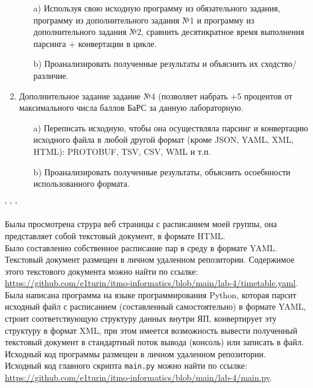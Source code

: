 \begin{enumerate}
    \begin{itemize}
        \item[a)] Используя свою исходную программу из обязательного  задания, программу из дополнительного задания №1 и  программу из дополнительного задания №2, сравнить  десятикратное время выполнения парсинга + конвертации в  цикле.
        \item[b)] Проанализировать полученные результаты и объяснить их  сходство/различие.
    \end{itemize}
\item Дополнительное задание задание №4 (позволяет набрать +5 процентов  от максимального числа баллов БаРС за данную лабораторную.
    \begin{itemize}
        \item[a)] Переписать исходную, чтобы она осуществляла парсинг и  конвертацию исходного файла в любой другой формат (кроме  JSON, YAML, XML, HTML): PROTOBUF, TSV, CSV, WML и  т.п.
        \item[b)] Проанализировать полученные результаты, объяснить  осоебнности использованного формата.
    \end{itemize}
\end{enumerate}
\begin{center}
    {` ` `}
\end{center}  


\newpage
{}
Былы просмотрена струра веб страницы с расписанием моей группы, она представляет собой текстовый документ, в формате HTML.\\
Было составленно собственное расписание пар в среду в формате YAML.
Текстовый документ размещен в личном удаленном репозитории.  Содержимое этого текстового документа можно найти по ссылке: \url{https://github.com/e1turin/itmo-informatics/blob/main/lab-4/timetable.yaml}.\\


Была написана программа на языке программирования Python, которая парсит исходный файл с расписанием (составленный самостоятельно) в формате YAML, строит соответствующую структуру данных внутри ЯП, конвертирует эту структуру в формат XML, при этом имеется возможность вывести полученный текстовый документ в стандартный поток вывода (консоль) или записать в файл.\\
Исходный код программы размещен в личном удаленном репозитории. \\
Исходный код главного скрипта \texttt{main.py} можно найти по ссылке:\\ \url{https://github.com/e1turin/itmo-informatics/blob/main/lab-4/main.py}.\\


